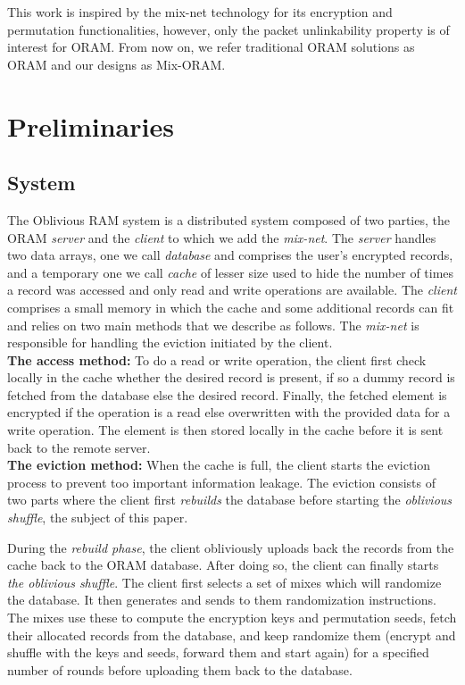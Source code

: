 \documentclass{llncs}
\begin{document}
This work is inspired by the mix-net technology for its encryption and permutation functionalities, however, only the packet unlinkability property is of interest for ORAM. From now on, we refer traditional ORAM solutions as ORAM and our designs as Mix-ORAM.

\section{Preliminaries}\label{Prelim}
%
\subsection{System}\label{System}

The Oblivious RAM system is a distributed system composed of two parties, the ORAM \emph{server} and the \emph{client} to which we add the \emph{mix-net}. The \emph{server} handles two data arrays, one we call \emph{database} and comprises the user's encrypted records, and a temporary one we call \emph{cache} of lesser size used to hide the number of times a record was accessed and only read and write operations are available.
The \emph{client} comprises a small memory in which the cache and some additional records can fit and relies on two main methods that we describe as follows. The \emph{mix-net} is responsible for handling the eviction initiated by the client.\\

\noindent\textbf{The access method:} To do a read or write operation, the client first check locally in the cache whether the desired record is present, if so a dummy record is fetched from the database else the desired record. Finally, the fetched element is encrypted if the operation is a read else overwritten with the provided data for a write operation. The element is then stored locally in the cache before it is sent back to the remote server.\\

\noindent\textbf{The eviction method:} When the cache is full, the client starts the eviction process to prevent too important information leakage. The eviction consists of two parts where the client first \textit{rebuilds} the database before starting the \textit{oblivious shuffle}, the subject of this paper.

During the \emph{rebuild phase}, the client obliviously uploads back the records from the cache back to the ORAM database. After doing so, the client can finally starts \emph{the oblivious shuffle}. The client first selects a set of mixes which will randomize the database. It then generates and sends to them randomization instructions. The mixes use these to compute the encryption keys and permutation seeds, fetch their allocated records from the database, and keep randomize them (encrypt and shuffle with the keys and seeds, forward them and start again) for a specified number of rounds before uploading them back to the database.
\end{document}
